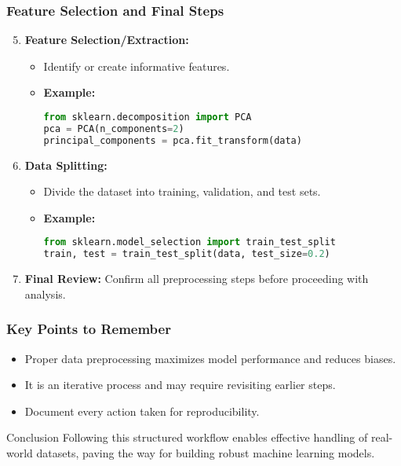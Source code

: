 \documentclass[aspectratio=169]{beamer}
\begin{document}
\begin{frame}[fragile]
    \frametitle{Feature Selection and Final Steps}
    \begin{enumerate}
        \setcounter{enumi}{4}
        \item \textbf{Feature Selection/Extraction:}
        \begin{itemize}
            \item Identify or create informative features.
            \item \textbf{Example:}
            \begin{lstlisting}[language=Python]
from sklearn.decomposition import PCA
pca = PCA(n_components=2)
principal_components = pca.fit_transform(data)
            \end{lstlisting}
        \end{itemize}
        
        \item \textbf{Data Splitting:}
        \begin{itemize}
            \item Divide the dataset into training, validation, and test sets.
            \item \textbf{Example:}
            \begin{lstlisting}[language=Python]
from sklearn.model_selection import train_test_split
train, test = train_test_split(data, test_size=0.2)
            \end{lstlisting}
        \end{itemize}

        \item \textbf{Final Review:} Confirm all preprocessing steps before proceeding with analysis.
    \end{enumerate}
\end{frame}

\begin{frame}
    \frametitle{Key Points to Remember}
    \begin{itemize}
        \item Proper data preprocessing maximizes model performance and reduces biases.
        \item It is an iterative process and may require revisiting earlier steps.
        \item Document every action taken for reproducibility.
    \end{itemize}
    \begin{block}{Conclusion}
        Following this structured workflow enables effective handling of real-world datasets, paving the way for building robust machine learning models.
    \end{block}
\end{frame}
\end{document}
